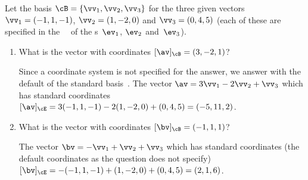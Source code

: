 \begin{example} 
Let the basis \(\cB=\{\vv_1,\vv_2,\vv_3\}\) for the three given vectors \(\vv_1=(-1,1,-1)\), \(\vv_2=(1,-2,0)\) and \(\vv_3=(0,4,5)\) (each of these are specified in the ~\cE\ of the s~\(\ev_1\), \(\ev_2\) and~\(\ev_3\)).
\begin{enumerate}
\item What is the vector with coordinates \([\av]_\cB=(3,-2,1)\)?
\begin{solution} 
Since a coordinate system is not specified for the answer, we answer with the default of the standard basis~\cE.
The vector \(\av=3\vv_1-2\vv_2+\vv_3\) which has standard coordinates 
\([\av]_\cE=3(-1,1,-1)-2(1,-2,0)+(0,4,5)=(-5,11,2)\).
\end{solution}

\item What is the vector with coordinates \([\bv]_\cB=(-1,1,1)\)?
\begin{solution} 
The vector \(\bv=-\vv_1+\vv_2+\vv_3\) which has standard coordinates (the default coordinates as the question does not specify) 
\([\bv]_\cE=-(-1,1,-1)+(1,-2,0)+(0,4,5)=(2,1,6)\).
\end{solution}


\end{enumerate}
\end{example}
